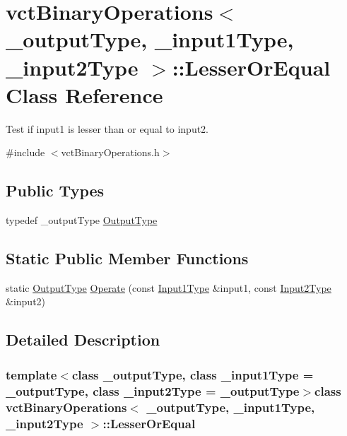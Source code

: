\hypertarget{classvct_binary_operations_1_1_lesser_or_equal}{}\section{vct\+Binary\+Operations$<$ \+\_\+output\+Type, \+\_\+input1\+Type, \+\_\+input2\+Type $>$\+:\+:Lesser\+Or\+Equal Class Reference}
\label{classvct_binary_operations_1_1_lesser_or_equal}


Test if input1 is lesser than or equal to input2.  




{\ttfamily \#include $<$vct\+Binary\+Operations.\+h$>$}

\subsection*{Public Types}
\begin{DoxyCompactItemize}
\item 
typedef \+\_\+output\+Type \hyperlink{classvct_binary_operations_1_1_lesser_or_equal_adff9c45eb56546ff372f5b7a614bb271}{Output\+Type}
\end{DoxyCompactItemize}
\subsection*{Static Public Member Functions}
\begin{DoxyCompactItemize}
\item 
static \hyperlink{classvct_binary_operations_1_1_lesser_or_equal_adff9c45eb56546ff372f5b7a614bb271}{Output\+Type} \hyperlink{classvct_binary_operations_1_1_lesser_or_equal_a1fbc00f49c2eaeaf287edd8c3537f5e3}{Operate} (const \hyperlink{classvct_binary_operations_a5e56a66a012d6a28c539a08a0021c45e}{Input1\+Type} \&input1, const \hyperlink{classvct_binary_operations_a929119af557a04a16b4d854981e49e1b}{Input2\+Type} \&input2)
\end{DoxyCompactItemize}


\subsection{Detailed Description}
\subsubsection*{template$<$class \+\_\+output\+Type, class \+\_\+input1\+Type = \+\_\+output\+Type, class \+\_\+input2\+Type = \+\_\+output\+Type$>$class vct\+Binary\+Operations$<$ \+\_\+output\+Type, \+\_\+input1\+Type, \+\_\+input2\+Type $>$\+::\+Lesser\+Or\+Equal}

